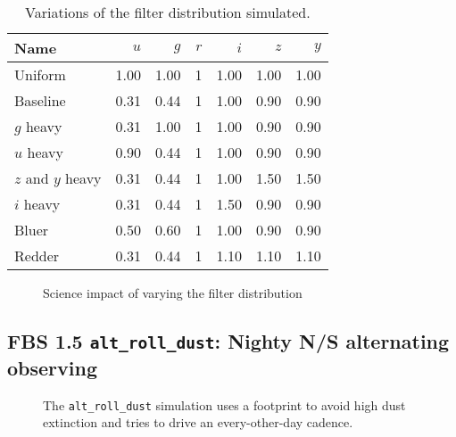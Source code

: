 \begin{table}
\begin{centering}
\begin{tabular}{lrrrrrr}
              Name &     $u$ &     $g$ &  $r$ &     $i$ &     $z$ &     $y$ \\
\hline
           Uniform & 1.00 & 1.00 &  1 & 1.00 & 1.00 & 1.00 \\
          Baseline & 0.31 & 0.44 &  1 & 1.00 & 0.90 & 0.90 \\
         $g$ heavy & 0.31 & 1.00 &  1 & 1.00 & 0.90 & 0.90 \\
         $u$ heavy & 0.90 & 0.44 &  1 & 1.00 & 0.90 & 0.90 \\
        $z$ and $y$ heavy & 0.31 & 0.44 &  1 & 1.00 & 1.50 & 1.50 \\
         $i$ heavy & 0.31 & 0.44 &  1 & 1.50 & 0.90 & 0.90 \\
             Bluer & 0.50 & 0.60 &  1 & 1.00 & 0.90 & 0.90 \\
            Redder & 0.31 & 0.44 &  1 & 1.10 & 1.10 & 1.10 \\
\hline
\end{tabular}
\caption{Variations of the filter distribution simulated.}\label{table:filtdist}
\end{centering}
\end{table}

\begin{figure}
\caption{Science impact of varying the filter distribution}\label{fig:filterdist_radar}
\end{figure}


\subsection{FBS 1.5  {\tt alt\_roll\_dust}: Nighty N/S alternating observing}

\begin{figure}
\caption{The {\tt alt\_roll\_dust} simulation uses a footprint to avoid high dust extinction and tries to drive an every-other-day cadence.}\label{fig:altdust}
\end{figure}

